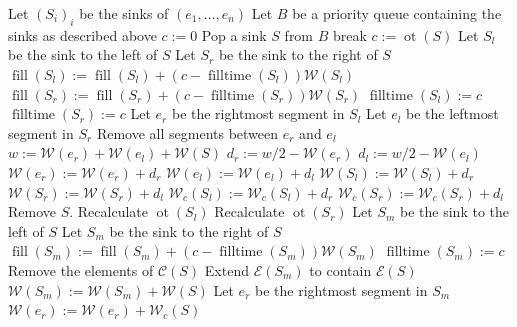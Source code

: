 \documentclass[11pt,a4paper]{article}
\DeclareMathOperator{\ot}{ot}
\DeclareMathOperator{\Fill}{fill}
\DeclareMathOperator{\filltime}{filltime}
\begin{document}
\begin{algorithmic}[1]
    \State Let $(S_i)_i$ be the sinks of $(e_1,\ldots,e_n)$
    \State Let $B$ be a priority queue containing the sinks as described above
    \State $c := 0$
     \label{a2:while}
        \State Pop a sink $S$ from $B$
        \If{$\ot(S)\ge T$}
            \State break
        \EndIf
        \State $c := \ot(S)$
            \State Let $S_l$ be the sink to the left of $S$
            \State Let $S_r$ be the sink to the right of $S$
            \State $\Fill(S_l) := \Fill(S_l) + (c - \filltime(S_l))\mathcal{W}(S_l)$
            \State $\Fill(S_r) := \Fill(S_r) + (c - \filltime(S_r))\mathcal{W}(S_r)$
            \State $\filltime(S_l) := c$
            \State $\filltime(S_r) := c$
            \State Let $e_r$ be the rightmost segment in $S_l$
            \State Let $e_l$ be the leftmost segment in $S_r$
            \State Remove all segments between $e_r$ and $e_l$
            \State $w := \mathcal{W}(e_r) + \mathcal{W}(e_l) +\mathcal{W}(S)$
            \State $d_r := w/2 - \mathcal{W}(e_r)$
            \State $d_l := w/2 - \mathcal{W}(e_l)$
            \State $\mathcal{W}(e_r) := \mathcal{W}(e_r) + d_r$
            \State $\mathcal{W}(e_l) := \mathcal{W}(e_l) + d_l$
            \State $\mathcal{W}(S_l) := \mathcal{W}(S_l) + d_r$
            \State $\mathcal{W}(S_r) := \mathcal{W}(S_r) + d_l$
              \State $\mathcal{W}_c(S_l) := \mathcal{W}_c(S_l) + d_r$
            \EndIf
              \State $\mathcal{W}_c(S_r) := \mathcal{W}_c(S_r) + d_l$
            \EndIf
            \State Remove $S$.
            \State Recalculate $\ot(S_l)$
            \State Recalculate $\ot(S_r)$
        \Else
              \State Let $S_m$ be the sink to the left of $S$
            \Else
              \State Let $S_m$ be the sink to the right of $S$
            \EndIf
            \State $\Fill(S_m) := \Fill(S_m) + (c - \filltime(S_m))\mathcal{W}(S_m)$
            \State $\filltime(S_m) := c$
            \State Remove the elements of $\mathcal{C}(S)$
            \State Extend $\mathcal{E}(S_m)$ to contain $\mathcal{E}(S)$
            \State $\mathcal{W}(S_m) := \mathcal{W}(S_m) + \mathcal{W}(S)$
              \State Let $e_r$ be the rightmost segment in $S_m$
              \State $\mathcal{W}(e_r) := \mathcal{W}(e_r) + \mathcal{W}_c(S)$

\end{algorithmic}
\end{document}
